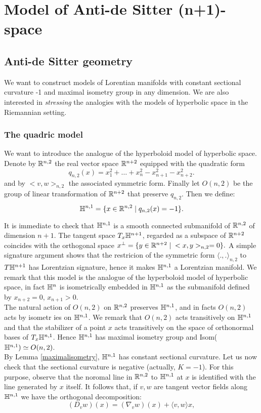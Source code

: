\chapter{Model of Anti-de Sitter (n+1)-space}
\section{Anti-de Sitter geometry}
We want to construct models of Lorentian manifolds with constant sectional curvature -1 and maximal isometry group in any dimension. We are also interested in \textit{stressing} the analogies with the models of hyperbolic space in the Riemannian setting. 

\subsection{The quadric model}
We want to introduce the analogue of the hyperboloid model of hyperbolic space. Denote by $\mathbb{R}^{n,2}$ the real vector space $\mathbb{R}^{n+2}$ equipped with the quadratic form 
\[
    q_{n,2}(x)=x_1^{2}+\dots+x_n^{2}-x_{n+1}^{2}-x_{n+2}^2.   
\]
and by $<v,w>_{n,2}$ the associated symmetric form. Finally let $O(n,2)$ be the group of linear transformation of $\mathbb{R}^{n+2}$ that preserve $q_{n,2}.$
Then we define: 
\[
    \mathbb{H}^{n,1}=\{x\in \mathbb{R}^{n,2}\;|\;q_{n,2}(x)=-1\}.
\]

It is immediate to check that $\mathbb{H}^{n,1}$ is a smooth connected submanifold of $\mathbb{R}^{n,2}$ of dimension $n+1$. The tangent space $T_x\mathbb{H}^{n+1}$, regarded as a subspace of $\mathbb{R}^{n+2}$ coincides with the orthogonal space $x^{\perp}=\{y\in \mathbb{R}^{n+2}\;|\;<x,y>_{n,2}=0\}.$ A simple signature argument  shows that the restricion of the symmetric form $\langle .,. \rangle_{n,2}$ to $T\mathbb{H}^{n+1}$ has Lorentzian signature, hence it makes $\mathbb{H}^{n,1}$ a Lorentzian manifold. We remark that this model is the analogue of the hyperboloid model of hyperbolic space, in fact $\mathbb{H}^n$ is isometrically embedded in $\mathbb{H}^{n,1}$ as the submanifold defined by $x_{n+2}=0$, $x_{n+1}>0$. \\
The natural action of $O(n,2)$ on $\mathbb{R}^{n,2}$ preserves $\mathbb{H}^{n,1}$, and in facts $O(n,2)$ acts by isometr   ies on $\mathbb{H}^{n,1}$. We remark that $O(n,2)$ acts transitively on $\mathbb{H}^{n,1}$ and that the stabilizer of a point $x$ acts transitively on the space of orthonormal bases of $T_x\mathbb{H}^{n,1}$. Hence $\mathbb{H}^{n,1}$ has maximal isometry group and Isom($\mathbb{H}^{n,1})\simeq O(n,2)$.\\
By Lemma \ref{maximalisometry}, $\mathbb{H}^{n,1}$ has constant sectional curvature. Let us now check that the sectional curvature is negative (actually, $K=-1$). For this purpose, observe that the noromal line in $\mathbb{R}^{n,2}$ to $\mathbb{H}^{n,1}$ at $x$ is identified with the line generated by $x$ itself. It follows that, if $v,w$ are tangent vector fields along $\mathbb{H}^{n,1}$ we have the orthogonal decomposition: 
\[
    (D_{v}w)(x)=(\nabla_{v}w)(x)+\langle v,w\rangle x, 
\]

